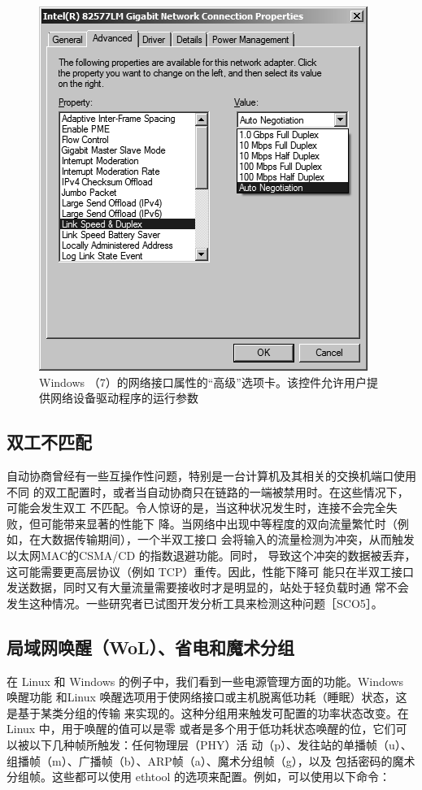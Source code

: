 \begin{figure}
  \centering
  \includegraphics[scale=0.5]{imgs/3/3-6.png}
  \caption{Windows （7）的网络接口属性的“高级”选项卡。该控件允许用户提供网络设备驱动程序的运行参数}
\end{figure}

\subsection{双工不匹配}

自动协商曾经有一些互操作性问题，特别是一台计算机及其相关的交换机端口使用不同
的双工配置时，或者当自动协商只在链路的一端被禁用时。在这些情况下，可能会发生双工
不匹配。令人惊讶的是，当这种状况发生时，连接不会完全失败，但可能带来显著的性能下
降。当网络中出现中等程度的双向流量繁忙时（例如，在大数据传输期间），一个半双工接口
会将输入的流量检测为冲突，从而触发以太网MAC的CSMA/CD 的指数退避功能。同时，
导致这个冲突的数据被丢弃，这可能需要更高层协议（例如 TCP）重传。因此，性能下降可
能只在半双工接口发送数据，同时又有大量流量需要接收时才是明显的，站处于轻负载时通
常不会发生这种情况。一些研究者已试图开发分析工具来检测这种问题［SCO5］。

\subsection{局域网唤醒（WoL）、省电和魔术分组}

在 Linux 和 Windows 的例子中，我们看到一些电源管理方面的功能。Windows 唤醒功能
和Linux 唤醒选项用于使网络接口或主机脱离低功耗（睡眠）状态，这是基于某类分组的传输
来实现的。这种分组用来触发可配置的功率状态改变。在Linux 中，用于唤醒的值可以是零
或者是多个用于低功耗状态唤醒的位，它们可以被以下几种帧所触发：任何物理层（PHY）活
动（p）、发往站的单播帧（u）、组播帧（m）、广播帧（b）、ARP帧（a）、魔术分组帧（g），以及
包括密码的魔术分组帧。这些都可以使用 ethtool 的选项来配置。例如，可以使用以下命令：

